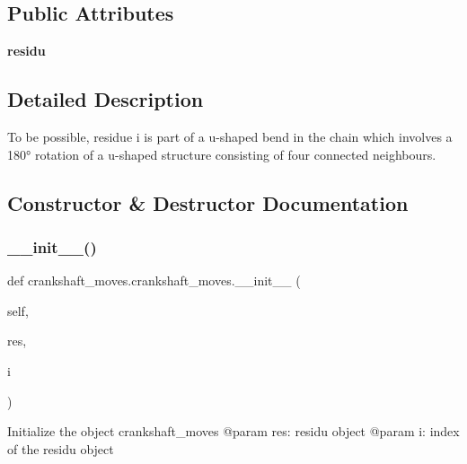 \subsection*{Public Attributes}
\begin{DoxyCompactItemize}
\item 
\mbox{\label{classcrankshaft__moves_1_1crankshaft__moves_a379f86aba6d320c666ba363aeb345a1a}} 
{\bfseries residu}
\end{DoxyCompactItemize}


\subsection{Detailed Description}
\begin{DoxyVerb}To be possible, residue i is part of a u-shaped bend in the chain which
involves a 180° rotation of a u-shaped structure consisting
of four connected neighbours.
\end{DoxyVerb}
 

\subsection{Constructor \& Destructor Documentation}
\mbox{\label{classcrankshaft__moves_1_1crankshaft__moves_a3d64490ab0dc61e8909c11c65555f512}} 
\subsubsection{\texorpdfstring{\+\_\+\+\_\+init\+\_\+\+\_\+()}{\_\_init\_\_()}}
{\footnotesize\ttfamily def crankshaft\+\_\+moves.\+crankshaft\+\_\+moves.\+\_\+\+\_\+init\+\_\+\+\_\+ (\begin{DoxyParamCaption}\item[{}]{self,  }\item[{}]{res,  }\item[{}]{i }\end{DoxyParamCaption})}

\begin{DoxyVerb}Initialize the object crankshaft_moves
    @param res: residu object
    @param   i: index of the residu object
\end{DoxyVerb}
 

